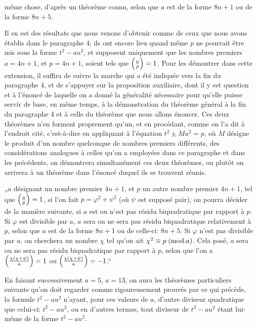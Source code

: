 \noindent
même chose, d'après un théorème connu, selon que $a$ est de la forme $8n+1$
ou de la forme $8n+5$.
\par\indent
Il en est des résultats que nous venons d'obtenir comme de ceux que
nous avons établis dans le paragraphe 4; ils ont encore lieu quand même $p$
ne pourrait être mis sous la forme $t^2-au^2$, et supposent uniquement que les
nombres premiers $a=4n+1$, et $p=4n+1$, soient tels que $\left(\frac{a}{p}\right)=1$. Pour
les démontrer dans cette extension, il suffira de suivre la marche qui a été
indiquée vers la fin du paragraphe 4, et de s'appuyer sur la proposition
auxiliaire, dont il y est question et à l'énoncé de laquelle on a donné la généralité
nécessaire pour qu'elle puisse servir de base, en même temps, à la
démonstration du théorème général à la fin du paragraphe 4 et à celle du théorème que
nous allons énoncer. Ces deux théorèmes n'en forment proprement qu'un, et
en procédant, comme on l'a dit à l'endroit cité, c'est-à-dire en appliquant à
l'équation $t^2\pm Mu^2=p$, où $M$ désigne le produit d'un nombre quelconque de
nombres premiers différents, des considérations analogues à celles qu'on a
employées dans ce paragraphe et dans les précédents, on démontrera
simultanément ces deux théorèmes, ou plutôt on arrivera à un théorème dans l'énoncé
duquel ils se trouvent réunis.
\par\indent
„$a$ désignant un nombre premier $4n+1$, et $p$ un autre nombre premier
$4n+1$, tel que $\left(\frac{a}{p}\right)=1$, si l'on fait $p=\varphi^2+\psi^2$ (où $\psi$ est supposé pair), on
pourra décider de la manière suivante, si $a$ est ou n'est pas résidu
biquadratique par rapport à $p$. Si $\varphi$ est divisible par $a$, $a$ sera ou ne sera pas résidu
biquadratique relativement à $p$, selon que $a$ est de la forme $8n+1$ ou de
celle-ci: $8n+5$. Si $\varphi$ n'est pas divisible par $a$, on cherchera un nombre $\chi$ tel
qu'on ait $\chi^2\equiv p\;(\mathrm{mod}.a)$. Cela posé, $a$ sera ou ne sera pas résidu
biquadratique par rapport à $p$, selon que l'on a $\left(\frac{\chi(\chi+\psi)}{a}\right)=1$ ou
$\left(\frac{\chi(\chi+\psi)}{a}\right)=-1$.“
\par\indent
En faisant successivement $a=5$, $a=13$, on aura les théorèmes
particuliers suivants qu'on doit regarder comme rigoureusement prouvés par ce qui
précède, la formule $t^2-au^2$ n'ayant, pour ces valeurs de $a$, d'autre diviseur
quadratique que celui-ci: $t^2-au^2$, ou en d'autres termes, tout diviseur de $t^2-au^2$
étant lui-même de la forme $t^2-au^2$.
